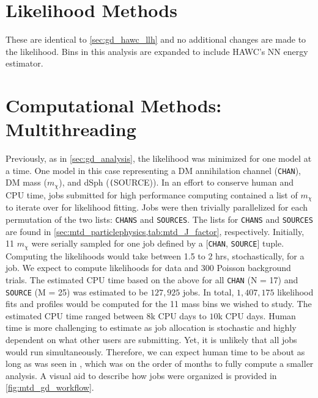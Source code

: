 \section{Likelihood Methods} \label{sec:mtd_ll_methods}

These are identical to \cref{sec:gd_hawc_llh} and no additional changes are made to the likelihood.
Bins in this analysis are expanded to include HAWC's NN energy estimator.

\section{Computational Methods: Multithreading} \label{sec:mtd_comp_methods}

Previously, as in \cref{sec:gd_analysis}, the likelihood was minimized for one model at a time.
One model in this case representing a DM annihilation channel (\texttt{CHAN}), DM mass ($m_\chi$), and dSph (\texttt(SOURCE)).
In an effort to conserve human and CPU time, jobs submitted for high performance computing contained a list of $m_\chi$ to iterate over for likelihood fitting.
Jobs were then trivially parallelized for each permutation of the two lists: \texttt{CHANS} and \texttt{SOURCES}.
The lists for \texttt{CHANS} and \texttt{SOURCES} are found in \cref{sec:mtd_particlephysics,tab:mtd_J_factor}, respectively.
Initially, 11 $m_\chi$ were serially sampled for one job defined by a [\texttt{CHAN}, \texttt{SOURCE}] tuple.
Computing the likelihoods would take between 1.5 to 2 hrs, stochastically, for a job.
We expect to compute likelihoods for data and 300 Poisson background trials.
The estimated CPU time based on the above for all \texttt{CHAN} (N = 17) and \texttt{SOURCE} (M = 25) was estimated to be $127,925$ jobs.
In total, $1,407,175$ likelihood fits and profiles would be computed for the 11 mass bins we wished to study.
The estimated CPU time ranged between $8$k CPU days to $10$k CPU days.
Human time is more challenging to estimate as job allocation is stochastic and highly dependent on what other users are submitting.
Yet, it is unlikely that all jobs would run simultaneously.
Therefore, we can expect human time to be about as long as was seen in , which was on the order of months to fully compute a smaller analysis.
A visual aid to describe how jobs were organized is provided in \cref{fig:mtd_gd_workflow}.

